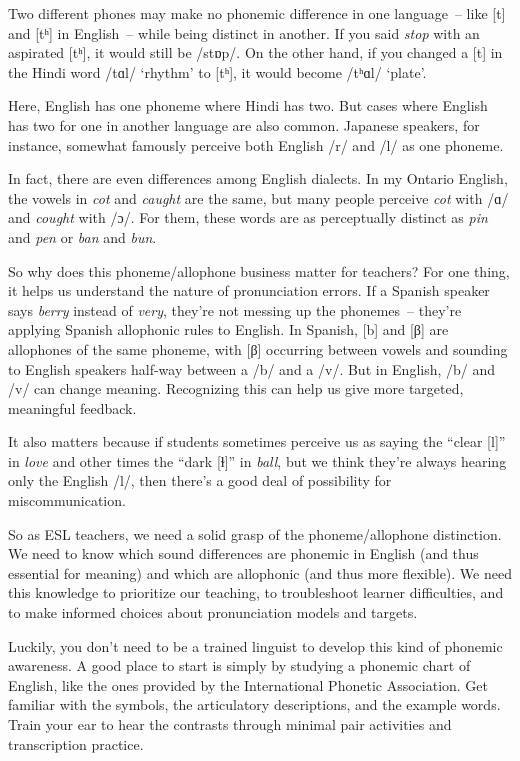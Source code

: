 Two different phones may make no phonemic difference in one language~-- like [t] and [tʰ] in English~-- while being distinct in another. If you said \textit{stop} with an aspirated [tʰ], it would still be /stɒp/. On the other hand, if you changed a [t] in the Hindi word /tɑl/ `rhythm' to [tʰ], it would become /tʰɑl/ `plate'.

Here, English has one phoneme where Hindi has two. But cases where English has two for one in another language are also common. Japanese speakers, for instance, somewhat famously perceive both English /r/ and /l/ as one phoneme.

In fact, there are even differences among English dialects. In my Ontario English, the vowels in \textit{cot} and \textit{caught} are the same, but many people perceive \textit{cot} with /ɑ/ and \textit{cought} with /ɔ/. For them, these words are as perceptually distinct as \textit{pin} and \textit{pen} or \textit{ban} and \textit{bun}.

So why does this phoneme/allophone business matter for teachers? For one thing, it helps us understand the nature of pronunciation errors. If a Spanish speaker says \textit{berry} instead of \textit{very}, they're not messing up the phonemes~-- they're applying Spanish allophonic rules to English. In Spanish, [b] and [β] are allophones of the same phoneme, with [β] occurring between vowels and sounding to English speakers half-way between a /b/ and a /v/. But in English, /b/ and /v/ can change meaning. Recognizing this can help us give more targeted, meaningful feedback.

It also matters because if students sometimes perceive us as saying the ``clear [l]'' in \textit{love} and other times the ``dark [ɫ]'' in \textit{ball}, but we think they're always hearing only the English /l/, then there's a good deal of possibility for miscommunication.

So as ESL teachers, we need a solid grasp of the phoneme/allophone distinction. We need to know which sound differences are phonemic in English (and thus essential for meaning) and which are allophonic (and thus more flexible). We need this knowledge to prioritize our teaching, to troubleshoot learner difficulties, and to make informed choices about pronunciation models and targets.

Luckily, you don't need to be a trained linguist to develop this kind of phonemic awareness. A good place to start is simply by studying a phonemic chart of English, like the ones provided by the International Phonetic Association. Get familiar with the symbols, the articulatory descriptions, and the example words. Train your ear to hear the contrasts through minimal pair activities and transcription practice. 

